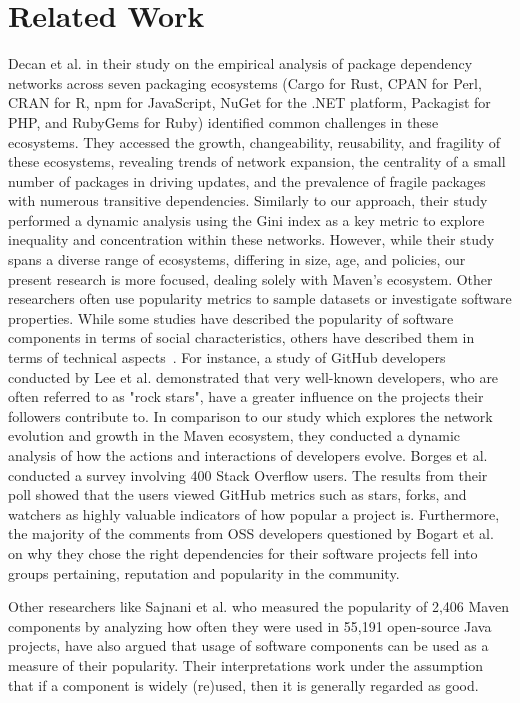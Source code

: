 \section{Related Work}
\label{section:relatedwork}

Decan et al. \cite{decan2019empirical} in their study on the empirical analysis of package dependency networks across seven packaging ecosystems (Cargo for Rust, CPAN for Perl, CRAN for R, npm for JavaScript, NuGet for the .NET platform, Packagist for PHP, and RubyGems for Ruby) identified common challenges in these ecosystems. They accessed the growth, changeability, reusability, and fragility of these ecosystems, revealing trends of network expansion, the centrality of a small number of packages in driving updates, and the prevalence of fragile packages with numerous transitive dependencies. Similarly to our approach, their study performed a dynamic analysis using the Gini index as a key metric to explore inequality and concentration within these networks. However, while their study spans a diverse range of ecosystems, differing in size, age, and policies, our present research is more focused, dealing solely with Maven's ecosystem.
Other researchers often use popularity metrics to sample datasets or investigate software properties. While some studies have described the popularity of software components in terms of social characteristics, others have described them in terms of technical aspects~\cite{Zerouali2014}. For instance, a study of GitHub developers conducted by Lee et al. \cite{lee2013github} demonstrated that very well-known developers, who are often referred to as "rock stars", have a greater influence on the projects their followers contribute to. In comparison to our study which explores the network evolution and growth in the Maven ecosystem, they conducted a dynamic analysis of how the actions and interactions of developers evolve.
Borges et al. \cite{borges2018s} conducted a survey involving 400 Stack Overflow users. The results from their poll showed that the users viewed GitHub metrics such as stars, forks, and watchers as highly valuable indicators of how popular a project is. Furthermore, the majority of the comments from OSS developers questioned by Bogart et al. \cite{bogart2016break} on why they chose the right dependencies for their software projects fell into groups pertaining, reputation and popularity in the community. 

Other researchers like Sajnani et al. \cite{sajnani2014popularity} who measured the popularity of 2,406 Maven components by analyzing how often they were used in 55,191 open-source Java projects, have also argued that usage of software components can be used as a measure of their popularity. Their interpretations work under the assumption that if a component is widely (re)used, then it is generally regarded as good.

